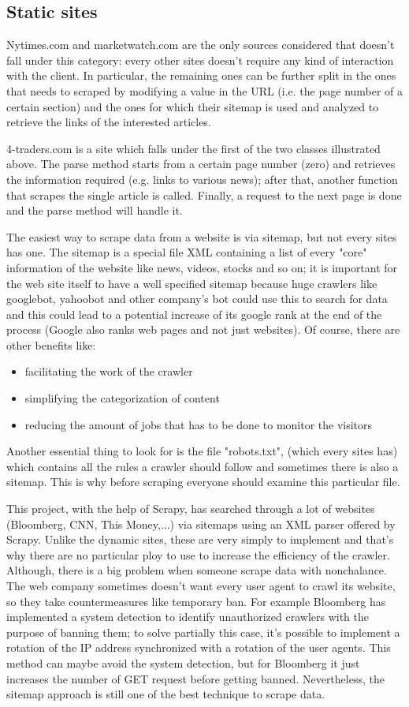 \subsection{Static sites}
Nytimes.com and marketwatch.com are the only sources considered that doesn't fall under this category: every other sites doesn't require any kind of interaction with the client. In particular, the remaining ones can be further split in the ones that needs to scraped by modifying a value in the URL (i.e. the page number of a certain section) and the ones for which their sitemap is used and analyzed to retrieve the links of the interested articles. 
\par
4-traders.com is a site which falls under the first of the two classes illustrated above. The parse method starts from a certain page number (zero) and retrieves the information required (e.g. links to various news); after that, another function that scrapes the single article is called. Finally, a request to the next page is done and the parse method will handle it.
\par 
The easiest way to scrape data from a website is via sitemap, but not every sites has one. 
The sitemap is a special file XML containing a list of every "core" information of the website like news, videos, stocks and so on; it is important for the web site itself to have a well specified sitemap because huge crawlers like googlebot, yahoobot and other company's bot could use this to search for data and this could lead to a potential increase of its google rank at the end of the process (Google also ranks web pages and not just websites). 
Of course, there are other benefits like:
\begin{itemize}
	\item facilitating the work of the crawler
	\item simplifying the categorization of content
	\item reducing the amount of jobs that has to be done to monitor the visitors
\end{itemize}
Another essential thing to look for is the file "robots.txt", (which every sites has) which contains all the rules a crawler should follow and sometimes there is also a sitemap. 
This is why before scraping everyone should examine this particular file. 
\par 
This project, with the help of Scrapy, has searched through a lot of websites (Bloomberg, CNN, This Money,...) via sitemaps using an XML parser offered by Scrapy. 
Unlike the dynamic sites, these are very simply to implement and that's why there are no particular ploy to use to increase the efficiency of the crawler. 
Although, there is a big problem when someone scrape data with nonchalance. 
The web company sometimes doesn't want every user agent to crawl its website, so they take countermeasures like temporary ban. 
For example Bloomberg has implemented a system detection to identify unauthorized crawlers with the purpose of banning them; to solve partially this case, it's possible to implement a rotation of the IP address synchronized with a rotation of the user agents. 
This method can maybe avoid the system detection, but for Bloomberg it just increases the number of GET request before getting banned. 
Nevertheless, the sitemap approach is still one of the best technique to scrape data.